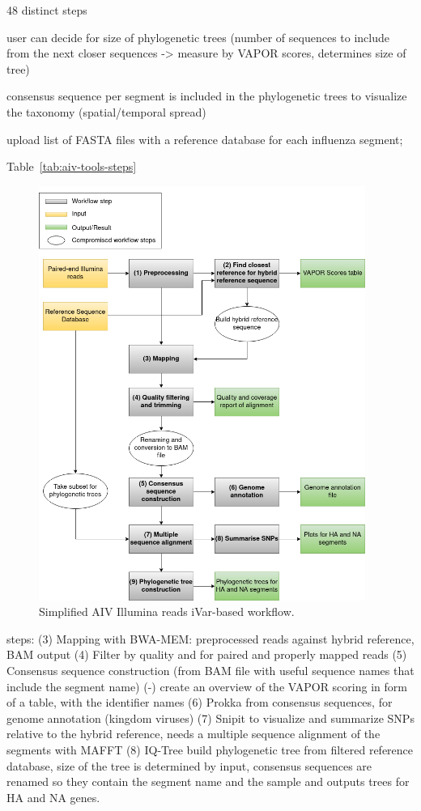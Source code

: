 48 distinct steps

user can decide for size of phylogenetic trees (number of sequences to include from the next closer sequences -> measure by VAPOR scores, determines size of tree)

consensus sequence per segment is included in the phylogenetic trees to visualize the taxonomy (spatial/temporal spread)

upload list of FASTA files with a reference database for each influenza segment;

Table~\ref{tab:aiv-tools-steps}

\begin{figure}[H]
	\includegraphics[width=0.95\textwidth]{media/aiv.png}
	\caption{Simplified AIV Illumina reads iVar-based workflow.}
	\label{fig:3-aiv-wf}
\end{figure}

steps:
(3) Mapping with BWA-MEM: preprocessed reads against hybrid reference, BAM output
(4) Filter by quality and for paired and properly mapped reads
(5) Consensus sequence construction (from BAM file with useful sequence names that include the segment name)
(-) create an overview of the VAPOR scoring in form of a table, with the identifier names
(6) Prokka from consensus sequences, for genome annotation (kingdom viruses)
(7) Snipit to visualize and summarize SNPs relative to the hybrid reference, needs a multiple sequence alignment of the segments with MAFFT
(8) IQ-Tree build phylogenetic tree from filtered reference database, size of the tree is determined by input, consensus sequences are renamed so they contain the segment name and the sample and outputs trees for HA and NA genes.

